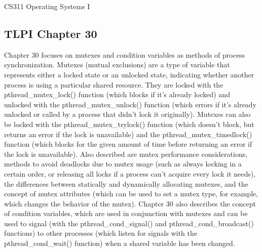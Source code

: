 \documentclass[letterpaper,10pt,fleqn]{article}
\numberwithin{equation}{section}
\begin{document}



{\Large CS311 Operating Systems I}

\subsection*{TLPI Chapter 30}

Chapter 30 focuses on mutexes and condition variables as methods of process synchronization.  Mutexes (mutual exclusions) are a type of variable that represents either a locked state or an unlocked state, indicating whether another process is using a particular shared resource.  They are locked with the pthread\_mutex\_lock() function (which blocks if it's already locked) and unlocked with the pthread\_mutex\_unlock() function (which errors if it's already unlocked or called by a process that didn't lock it originally).  Mutexes can also be locked with the pthread\_mutex\_trylock() function (which doesn't block, but returns an error if the lock is unavailable) and the pthread\_mutex\_timedlock() function (which blocks for the given amount of time before returning an error if the lock is unavailable).  Also described are mutex performance considerations, methods to avoid deadlocks due to mutex usage (such as always locking in a certain order, or releasing all locks if a process can't acquire every lock it needs), the differences between statically and dynamically allocating mutexes, and the concept of mutex attributes (which can be used to set a mutex type, for example, which changes the behavior of the mutex).  Chapter 30 also describes the concept of condition variables, which are used in conjunction with mutexes and can be used to signal (with the pthread\_cond\_signal() and pthread\_cond\_broadcast() functions) to other processes (which listen for signals with the pthread\_cond\_wait() function) when a shared variable has been changed.
\end{document}
